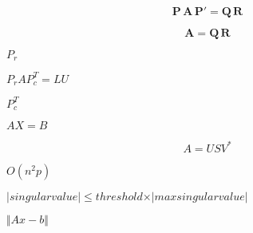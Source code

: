 \documentclass{article}
\begin{document}
\[ \mathbf{P} \, \mathbf{A} \, \mathbf{P}' = \mathbf{Q} \, \mathbf{R} \]
\pagebreak

\[ \mathbf{A} = \mathbf{Q} \, \mathbf{R} \]
\pagebreak

$ P_r $
\pagebreak

$P_r A P_c^T = L U$
\pagebreak

$ P_c^T $
\pagebreak

$ A X = B $
\pagebreak

\[ A = U S V^* \]
\pagebreak

$ O(n^2p) $
\pagebreak

$ \vert singular value \vert \leqslant threshold \times \vert max singular value \vert $
\pagebreak

$ \Vert A x - b \Vert $
\pagebreak
\end{document}
